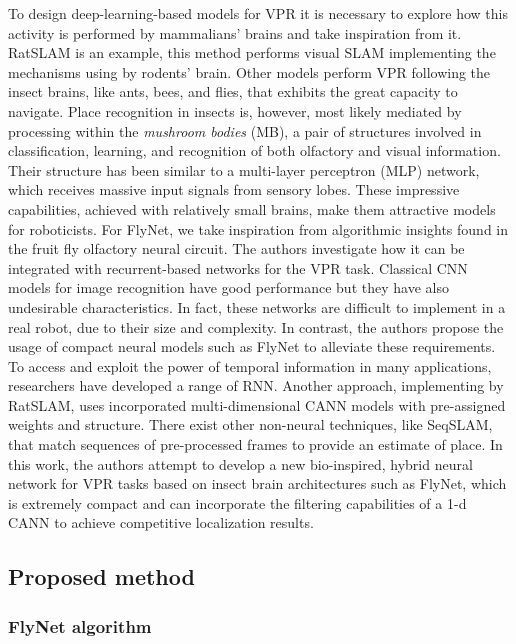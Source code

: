 To design deep-learning-based models for VPR it is necessary to explore
how this activity is performed by mammalians' brains and take
inspiration from it. RatSLAM is an example, this method performs visual
SLAM implementing the mechanisms using by rodents' brain. Other models
perform VPR following the insect brains, like ants, bees, and flies,
that exhibits the great capacity to navigate. Place recognition in
insects is, however, most likely mediated by processing within the
\emph{mushroom bodies} (MB), a pair of structures involved in
classification, learning, and recognition of both olfactory and visual
information. Their structure has been similar to a multi-layer
perceptron (MLP) network, which receives massive input signals from
sensory lobes. These impressive capabilities, achieved with relatively
small brains, make them attractive models for roboticists. For FlyNet,
we take inspiration from algorithmic insights found in the fruit fly
olfactory neural circuit. The authors investigate how it can be
integrated with recurrent-based networks for the VPR task. Classical CNN
models for image recognition have good performance but they have also
undesirable characteristics. In fact, these networks are difficult to
implement in a real robot, due to their size and complexity. In
contrast, the authors propose the usage of compact neural models such as
FlyNet to alleviate these requirements. To access and exploit the power
of temporal information in many applications, researchers have developed
a range of RNN. Another approach, implementing by RatSLAM, uses
incorporated multi-dimensional CANN models with pre-assigned weights and
structure. There exist other non-neural techniques, like SeqSLAM, that
match sequences of pre-processed frames to provide an estimate of place.
In this work, the authors attempt to develop a new bio-inspired, hybrid
neural network for VPR tasks based on insect brain architectures such as
FlyNet, which is extremely compact and can incorporate the filtering
capabilities of a 1-d CANN to achieve competitive localization results.

\subsection{Proposed method}\label{header-n189}

\subsubsection{FlyNet algorithm}\label{header-n190}

